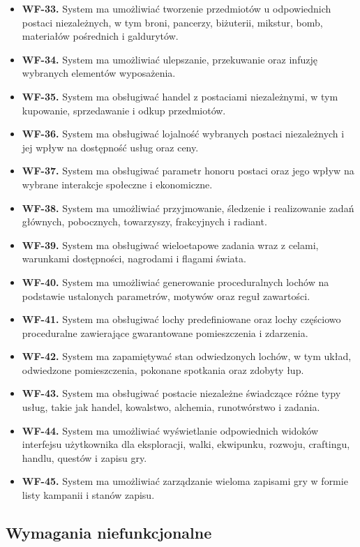 \begin{itemize}
    \item \textbf{WF-33.} System ma umożliwiać tworzenie przedmiotów u odpowiednich postaci niezależnych, w tym broni, pancerzy, biżuterii, mikstur, bomb, materiałów pośrednich i galdurytów.
    \item \textbf{WF-34.} System ma umożliwiać ulepszanie, przekuwanie oraz infuzję wybranych elementów wyposażenia.
    \item \textbf{WF-35.} System ma obsługiwać handel z postaciami niezależnymi, w tym kupowanie, sprzedawanie i odkup przedmiotów.
    \item \textbf{WF-36.} System ma obsługiwać lojalność wybranych postaci niezależnych i jej wpływ na dostępność usług oraz ceny.
    \item \textbf{WF-37.} System ma obsługiwać parametr honoru postaci oraz jego wpływ na wybrane interakcje społeczne i ekonomiczne.
    \item \textbf{WF-38.} System ma umożliwiać przyjmowanie, śledzenie i realizowanie zadań głównych, pobocznych, towarzyszy, frakcyjnych i radiant.
    \item \textbf{WF-39.} System ma obsługiwać wieloetapowe zadania wraz z celami, warunkami dostępności, nagrodami i flagami świata.
    \item \textbf{WF-40.} System ma umożliwiać generowanie proceduralnych lochów na podstawie ustalonych parametrów, motywów oraz reguł zawartości.
    \item \textbf{WF-41.} System ma obsługiwać lochy predefiniowane oraz lochy częściowo proceduralne zawierające gwarantowane pomieszczenia i zdarzenia.
    \item \textbf{WF-42.} System ma zapamiętywać stan odwiedzonych lochów, w tym układ, odwiedzone pomieszczenia, pokonane spotkania oraz zdobyty łup.
    \item \textbf{WF-43.} System ma obsługiwać postacie niezależne świadczące różne typy usług, takie jak handel, kowalstwo, alchemia, runotwórstwo i zadania.
    \item \textbf{WF-44.} System ma umożliwiać wyświetlanie odpowiednich widoków interfejsu użytkownika dla eksploracji, walki, ekwipunku, rozwoju, craftingu, handlu, questów i zapisu gry.
    \item \textbf{WF-45.} System ma umożliwiać zarządzanie wieloma zapisami gry w formie listy kampanii i stanów zapisu.
\end{itemize}

\subsection{Wymagania niefunkcjonalne}
\label{subsec:wymagania-niefunkcjonalne}

